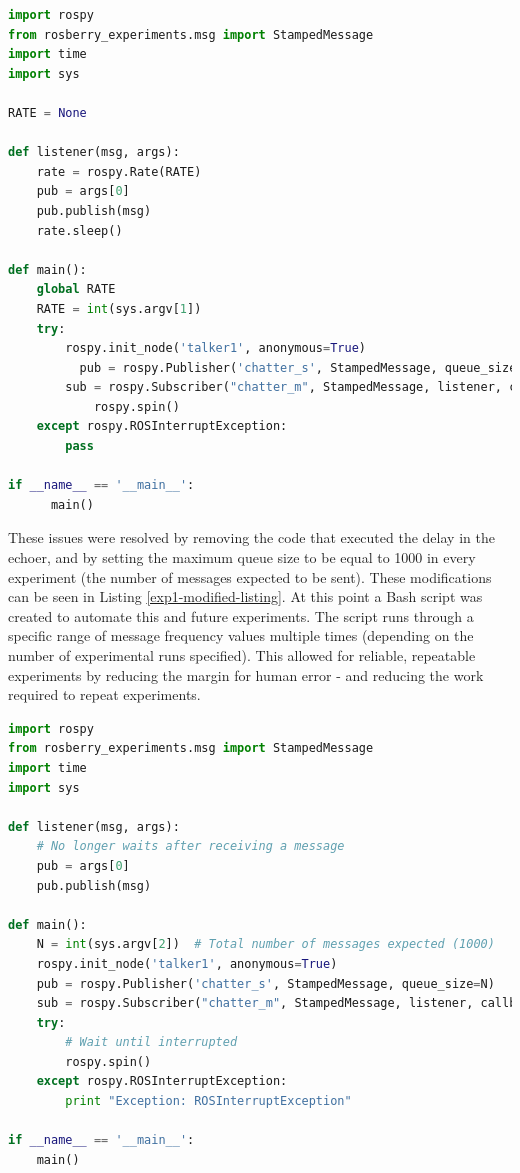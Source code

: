 \documentclass[../dissertation.tex]{subfiles}
\begin{document}
\begin{lstlisting}[language=Python, caption=Echoer Original]
import rospy
from rosberry_experiments.msg import StampedMessage
import time
import sys

RATE = None

def listener(msg, args):
    rate = rospy.Rate(RATE)
    pub = args[0]
    pub.publish(msg)
    rate.sleep()

def main():
    global RATE
    RATE = int(sys.argv[1])
    try:
        rospy.init_node('talker1', anonymous=True)
	      pub = rospy.Publisher('chatter_s', StampedMessage, queue_size=RATE)
        sub = rospy.Subscriber("chatter_m", StampedMessage, listener, callback_args=[pub])
		    rospy.spin()
    except rospy.ROSInterruptException:
        pass

if __name__ == '__main__':
	  main()
\end{lstlisting}

These issues were resolved by removing the code that executed the delay in the echoer, and by setting the maximum queue size to be equal to 1000 in every experiment (the number of messages expected to be sent). These modifications can be seen in Listing \ref{exp1-modified-listing}. At this point a Bash script was created to automate this and future experiments. The script runs through a specific range of message frequency values multiple times (depending on the number of experimental runs specified). This allowed for reliable, repeatable experiments by reducing the margin for human error - and reducing the work required to repeat experiments.

\begin{lstlisting}[language=Python, caption=Echoer Modified, label={exp1-modified-listing}]
import rospy
from rosberry_experiments.msg import StampedMessage
import time
import sys

def listener(msg, args):
    # No longer waits after receiving a message
    pub = args[0]
    pub.publish(msg)

def main():
    N = int(sys.argv[2])  # Total number of messages expected (1000)
    rospy.init_node('talker1', anonymous=True)
    pub = rospy.Publisher('chatter_s', StampedMessage, queue_size=N)
    sub = rospy.Subscriber("chatter_m", StampedMessage, listener, callback_args=[pub])
    try:
        # Wait until interrupted
        rospy.spin()
    except rospy.ROSInterruptException:
        print "Exception: ROSInterruptException"

if __name__ == '__main__':
    main()
\end{lstlisting}
\end{document}
